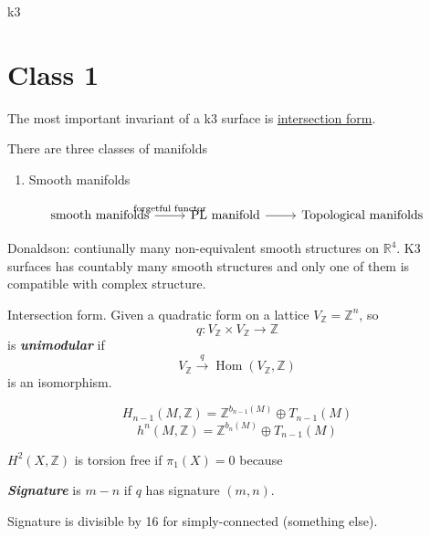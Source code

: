 



{\Huge k3}

\section{Class 1}

The most important invariant of a k3 surface is \href{https://en.wikipedia.org/wiki/Intersection_form_of_a_4-manifold}{intersection form}.

There are three classes of manifolds
\begin{enumerate}
	\item Smooth manifolds
\end{enumerate}

\[\begin{tikzcd}
	\text{smooth manifolds}\arrow[r,"\text{forgetful functor} "]&\text{PL manifold}\arrow[r]&\text{Topological manifolds}   
\end{tikzcd}\]

Donaldson: contiunally many non-equivalent smooth structures on $\mathbb{R}^{4}$. K3 surfaces has countably many smooth structures and only one of them is compatible with complex structure.

\begin{defn}
	Intersection form. Given a quadratic form on a lattice $V_{\mathbb{Z}}=\mathbb{Z}^n$, so 
	 \[q:V_{\mathbb{Z}}\times V_{\mathbb{Z}}\to \mathbb{Z}\]
	 is \textit{\textbf{unimodular}} if 
	 \[V_{\mathbb{Z}}\overset{q}{\longrightarrow} \operatorname{Hom}(V_{\mathbb{Z}},\mathbb{Z})\]
	 is an isomorphism.
\end{defn}

\begin{thm}\leavevmode
	\[H_{n-1}(M,\mathbb{Z})=\mathbb{Z}^{b_{n-1}(M)}\oplus T_{n-1}(M)\]
	\[h^n(M,\mathbb{Z})=\mathbb{Z}^{b_{n}(M)}\oplus T_{n-1}(M)\]
\end{thm}

\begin{coro}
	$H^2(X,\mathbb{Z})$ is torsion free if $\pi_{1}(X) =0$ because 
\end{coro}

\begin{defn}
	\textit{\textbf{Signature}} is $m-n$ if $q$ has signature $(m,n)$.
\end{defn}

\begin{thm}[Rokhlm-Wu?]\leavevmode
	Signature is divisible by 16 for simply-connected (something else).
\end{thm}

